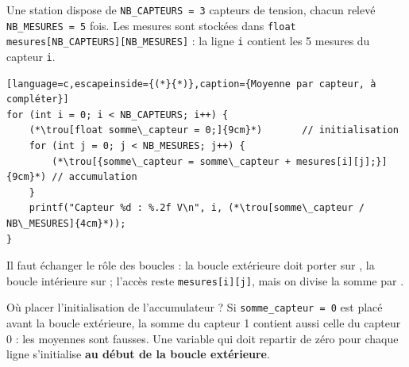 Une station dispose de \texttt{NB\_CAPTEURS = 3} capteurs de tension, chacun relevé \texttt{NB\_MESURES = 5} fois. Les mesures sont stockées dans \texttt{float mesures[NB\_CAPTEURS][NB\_MESURES]} : la ligne \texttt{i} contient les 5 mesures du capteur \texttt{i}.

\begin{UPSTIactivite}
\begin{lstlisting}[language=c,escapeinside={(*}{*)},caption={Moyenne par capteur, à compléter}]
for (int i = 0; i < NB_CAPTEURS; i++) {
    (*\trou[float somme\_capteur = 0;]{9cm}*)       // initialisation
    for (int j = 0; j < NB_MESURES; j++) {
        (*\trou[{somme\_capteur = somme\_capteur + mesures[i][j];}]{9cm}*) // accumulation
    }
    printf("Capteur %d : %.2f V\n", i, (*\trou[somme\_capteur / NB\_MESURES]{4cm}*));
}
\end{lstlisting}

Il faut échanger le rôle des boucles : la boucle extérieure doit porter sur , la boucle intérieure sur  ; l'accès reste \texttt{mesures[i][j]}, mais on divise la somme par \trou[NB\_CAPTEURS]{3cm}.
\end{UPSTIactivite}

\begin{UPSTIwarning}{Où placer l'initialisation de l'accumulateur ?}
  Si \texttt{somme\_capteur = 0} est placé avant la boucle extérieure, la somme du capteur 1 contient aussi celle du capteur 0 : les moyennes sont fausses. Une variable qui doit repartir de zéro pour chaque ligne s'initialise \textbf{au début de la boucle extérieure}.
\end{UPSTIwarning}
